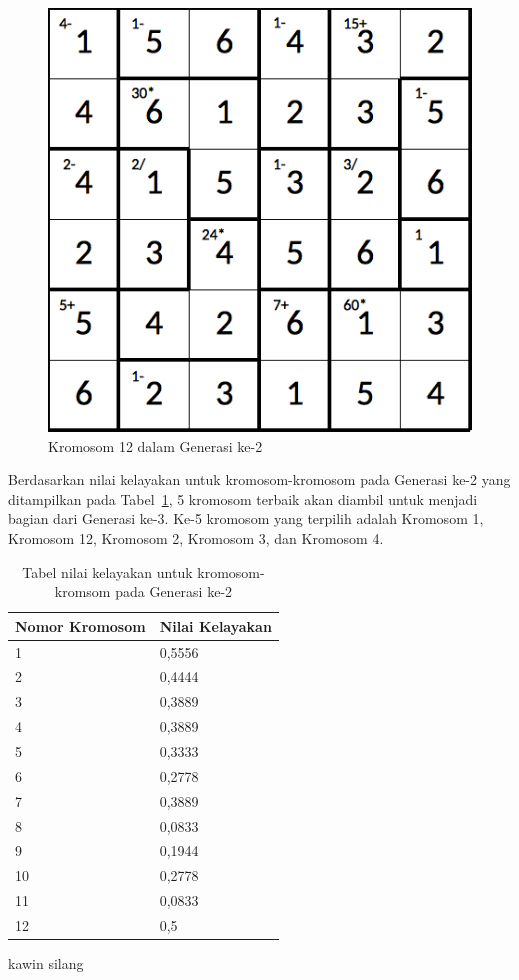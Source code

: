 \documentclass[a4paper,twoside]{article}
\begin{document}
\begin{enumerate}
\begin{figure}
\centering
\captionsetup{justification=centering}
\includegraphics[scale=0.333]{Gambar/hybridgenetic/Generation2Chromosome12}
\caption[Kromosom 12 dalam Generasi ke-2]{Kromosom 12 dalam Generasi ke-2}
\label{fig:analisisg2k12}
\end{figure}

\clearpage

Berdasarkan nilai kelayakan untuk kromosom-kromosom pada Generasi ke-2 yang ditampilkan pada Tabel~\ref{tab:analisishg3}, 5 kromosom terbaik akan diambil untuk menjadi bagian dari Generasi ke-3. Ke-5 kromosom yang terpilih adalah Kromosom 1, Kromosom 12, Kromosom 2, Kromosom 3, dan Kromosom 4.

\begin{table}
\centering
\captionsetup{justification=centering}
\begin{tabular}{| l | l |}
\hline
Nomor Kromosom & Nilai Kelayakan \\
\hline \hline
1 & 0,5556 \\
\hline
2 & 0,4444 \\
\hline
3 & 0,3889 \\
\hline
4 & 0,3889 \\
\hline
5 & 0,3333 \\
\hline
6 & 0,2778 \\
\hline
7 & 0,3889 \\
\hline
8 & 0,0833 \\
\hline
9 & 0,1944 \\
\hline
10 & 0,2778 \\
\hline
11 & 0,0833 \\
\hline
12 & 0,5 \\
\hline
\end{tabular}
\caption[Tabel nilai kelayakan untuk kromosom-kromsom pada Generasi ke-1]{Tabel nilai kelayakan untuk kromosom-kromsom pada Generasi ke-2}
\label{tab:analisishg3}kawin silang
\end{table}


\end{enumerate}
\end{document}
